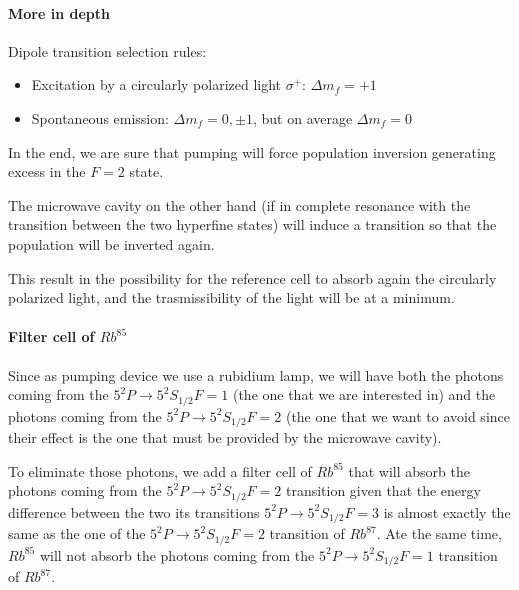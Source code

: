 \paragraph{More in depth}

Dipole transition selection rules:
\begin{itemize}
    \item Excitation by a circularly polarized light $\sigma^+$: $\Delta m_f = +1$
    \item Spontaneous emission: $\Delta m_f = 0, \pm 1$, but on average $\Delta m_f = 0$
\end{itemize}

In the end, we are sure that pumping will force population inversion generating excess in the $F=2$ state.

The microwave cavity on the other hand (if in complete resonance with the transition between the two hyperfine states) will induce a transition so that the population will be inverted again.

This result in the possibility for the reference cell to absorb again the circularly polarized light, and the trasmissibility of the light will be at a minimum.

\paragraph{Filter cell of $Rb^{85}$}

Since as pumping device we use a rubidium lamp, we will have both the photons coming from the $5^2P \rightarrow 5^2S_{1/2} F=1$ (the one that we are interested in) and the photons coming from the $5^2P \rightarrow 5^2S_{1/2} F=2$ (the one that we want to avoid since their effect is the one that must be provided by the microwave cavity).

To eliminate those photons, we add a filter cell of $Rb^{85}$ that will absorb the photons coming from the $5^2P \rightarrow 5^2S_{1/2} F=2$ transition given that the energy difference between the two its transitions $5^2P \rightarrow 5^2S_{1/2} F=3$ is almost exactly the same as the one of the $5^2P \rightarrow 5^2S_{1/2} F=2$ transition of $Rb^{87}$.
Ate the same time, $Rb^{85}$ will not absorb the photons coming from the $5^2P \rightarrow 5^2S_{1/2} F=1$ transition of $Rb^{87}$.

